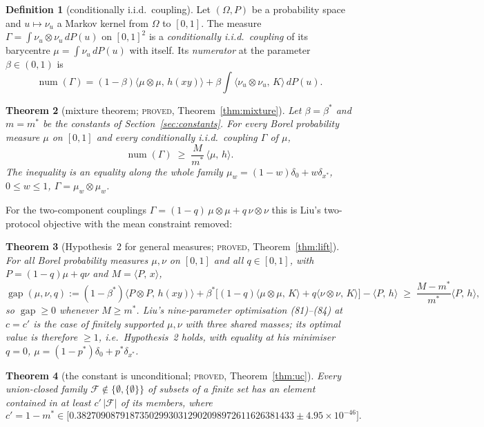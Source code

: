 \documentclass[11pt]{article}
\theoremstyle{plain}
\newtheorem{theorem}{Theorem}[section]
\theoremstyle{definition}
\newtheorem{definition}[theorem]{Definition}
\theoremstyle{remark}
\newcommand{\pr}[2]{\langle #1,\,#2\rangle}
\newcommand{\gap}{\operatorname{gap}}
\newcommand{\num}{\operatorname{num}}
\newcommand{\lbl}[1]{\textsc{#1}}
\begin{document}
\begin{definition}[conditionally i.i.d.\ coupling]\label{def:ciid}
Let $(\Omega,P)$ be a probability space and $u\mapsto\nu_u$ a Markov kernel
from $\Omega$ to $[0,1]$.  The measure
$\Gamma=\int\nu_u\otimes\nu_u\,dP(u)$ on $[0,1]^2$ is a
\emph{conditionally i.i.d.\ coupling} of its barycentre
$\mu=\int\nu_u\,dP(u)$ with itself.  Its \emph{numerator} at the parameter
$\beta\in(0,1)$ is
\begin{equation}\label{eq:num}
  \num(\Gamma)=(1-\beta)\pr{\mu\otimes\mu}{h(xy)}
  +\beta\int\pr{\nu_u\otimes\nu_u}{K}\,dP(u).
\end{equation}
\end{definition}

\begin{theorem}[mixture theorem; \lbl{proved}, Theorem~\ref{thm:mixture}]\label{thm:A}
Let $\beta=\beta^\ast$ and $m=m^\ast$ be the constants of
Section~\ref{sec:constants}.  For every Borel probability measure $\mu$ on
$[0,1]$ and every conditionally i.i.d.\ coupling $\Gamma$ of $\mu$,
\[
  \num(\Gamma)\;\ge\;\frac{M}{m^\ast}\,\pr{\mu}{h}.
\]
The inequality is an equality along the whole family
$\mu_w=(1-w)\delta_0+w\delta_{x^\ast}$, $0\le w\le1$, $\Gamma=\mu_w\otimes\mu_w$.
\end{theorem}

For the two-component couplings $\Gamma=(1-q)\,\mu\otimes\mu+q\,\nu\otimes\nu$
this is Liu's two-protocol objective with the mean constraint removed:

\begin{theorem}[Hypothesis~2 for general measures; \lbl{proved}, Theorem~\ref{thm:lift}]\label{thm:B}
For all Borel probability measures $\mu,\nu$ on $[0,1]$ and all
$q\in[0,1]$, with $P=(1-q)\mu+q\nu$ and $M=\pr{P}{x}$,
\[
  \gap(\mu,\nu,q):=(1-\beta^\ast)\pr{P\otimes P}{h(xy)}
  +\beta^\ast\bigl[(1-q)\pr{\mu\otimes\mu}{K}+q\pr{\nu\otimes\nu}{K}\bigr]
  -\pr{P}{h}\;\ge\;\frac{M-m^\ast}{m^\ast}\pr{P}{h},
\]
so $\gap\ge0$ whenever $M\ge m^\ast$.  Liu's nine-parameter optimisation
(81)--(84) at $c=c'$ is the case of finitely supported $\mu,\nu$ with three
shared masses; its optimal value is therefore $\ge1$, i.e.\ Hypothesis~2
holds, with equality at his minimiser $q=0$,
$\mu=(1-p^\ast)\delta_0+p^\ast\delta_{x^\ast}$.
\end{theorem}

\begin{theorem}[the constant is unconditional; \lbl{proved}, Theorem~\ref{thm:uc}]\label{thm:C}
Every union-closed family $\mathcal F\notin\{\emptyset,\{\emptyset\}\}$ of
subsets of a finite set has an element contained in at least
$c'\,|\mathcal F|$ of its members, where
\[
  c'=1-m^\ast\in\bigl[0.382709087918735029930312902098972611626381433
  \pm4.95\times10^{-46}\bigr].
\]
\end{theorem}
\end{document}
